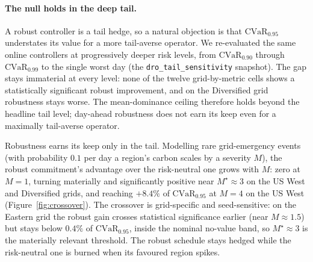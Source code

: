 \documentclass[10pt,twocolumn]{article}
\newcommand{\CVaR}{\mathrm{CVaR}}
\begin{document}
\paragraph{The null holds in the deep tail.} A robust controller is a tail hedge, so a
natural objection is that $\CVaR_{0.95}$ understates its value for a more tail-averse
operator. We re-evaluated the same online controllers at progressively deeper risk
levels, from $\CVaR_{0.90}$ through $\CVaR_{0.99}$ to the single worst day (the
\texttt{dro\_tail\_sensitivity} snapshot). The gap stays immaterial at every level: none
of the twelve grid-by-metric cells shows a statistically significant robust improvement,
and on the Diversified grid robustness stays worse. The mean-dominance ceiling therefore
holds beyond the headline tail level; day-ahead robustness does not earn its keep even
for a maximally tail-averse operator.

Robustness earns its keep only in the tail. Modelling rare grid-emergency events (with
probability $0.1$ per day a region's carbon scales by a severity $M$), the robust
commitment's advantage over the risk-neutral one grows with $M$: zero at $M=1$, turning
materially and significantly positive near $M^\star\approx3$ on the US West and
Diversified grids, and reaching $+8.4\%$ of $\CVaR_{0.95}$ at $M=4$ on the US West
(Figure~\ref{fig:crossover}). The crossover is grid-specific and seed-sensitive: on the
Eastern grid the robust gain crosses statistical significance earlier (near
$M\approx1.5$) but stays below $0.4\%$ of $\CVaR_{0.95}$, inside the nominal no-value
band, so $M^\star\approx3$ is the materially relevant threshold. The robust schedule
stays hedged while the risk-neutral one is burned when its favoured region spikes.
\end{document}
